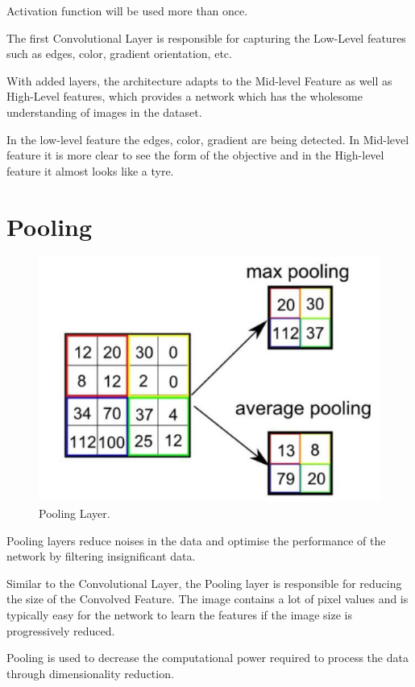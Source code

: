 \documentclass[a4paper,13pt,twoside]{book}
\begin{document}
Activation function will be used more than once.

The first Convolutional Layer is responsible for capturing the Low-Level features such as edges, color, gradient orientation, etc.

With added layers, the architecture adapts to the Mid-level Feature as well as High-Level features, which provides a network which has the wholesome understanding of images in the dataset.

In the low-level feature the edges, color, gradient are being detected. In Mid-level feature it is more clear to see the form of the objective and in the High-level feature it almost looks like a tyre.

\section{Pooling}

\begin{figure}[h!]
  \includegraphics[width=\linewidth]{Images/pooling(18).png}
  \caption{Pooling Layer.}
  \label{fig:Pooling}
\end{figure}

Pooling layers reduce noises in the data and optimise the performance of the network by filtering insignificant data.

Similar to the Convolutional Layer, the Pooling layer is responsible for reducing the size of the Convolved Feature.
The image contains a lot of pixel values and is typically easy for the network to learn the features if the image size is progressively reduced.

Pooling is used to decrease the computational power required to process the data through dimensionality reduction.
\end{document}
